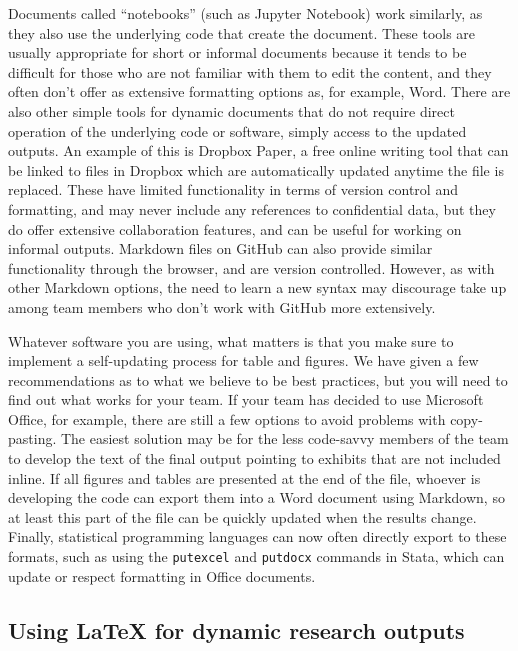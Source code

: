 Documents called ``notebooks''
(such as Jupyter Notebook)
work similarly,
as they also use the underlying code that create the document.
These tools are usually appropriate for short or informal documents
because it tends to be difficult for those who are not familiar with them to edit the content,
and they often don't offer as extensive formatting options as, for example, Word.
There are also other simple tools for dynamic documents
that do not require direct operation of the underlying code or software,
simply access to the updated outputs.
An example of this is Dropbox Paper,
a free online writing tool that can be linked to files in Dropbox
which are automatically updated anytime the file is replaced.
These have limited functionality in terms of version control and formatting,
and may never include any references to confidential data,
but they do offer extensive collaboration features,
and can be useful for working on informal outputs.
Markdown files on GitHub can also provide similar functionality through the browser,
and are version controlled.
However, as with other Markdown options, the need to learn a new syntax may
discourage take up among team members who don't work with GitHub more extensively.

Whatever software you are using,
what matters is that you make sure to implement a self-updating process for table and figures.
We have given a few recommendations as to what we believe to be best practices,
but you will need to find out what works for your team.
If your team has decided to use Microsoft Office, for example,
there are still a few options to avoid problems with copy-pasting.
The easiest solution may be for the less code-savvy members of the team
to develop the text of the final output pointing to exhibits that are not included inline.
If all figures and tables are presented at the end of the file,
whoever is developing the code can export them into a Word document using Markdown,
so at least this part of the file can be quickly updated when the results change.
Finally, statistical programming languages can now often directly export to these formats,
such as using the \texttt{putexcel} and \texttt{putdocx} commands in Stata, which can update or respect formatting in Office documents.

\subsection{Using {\LaTeX} for dynamic research outputs}

